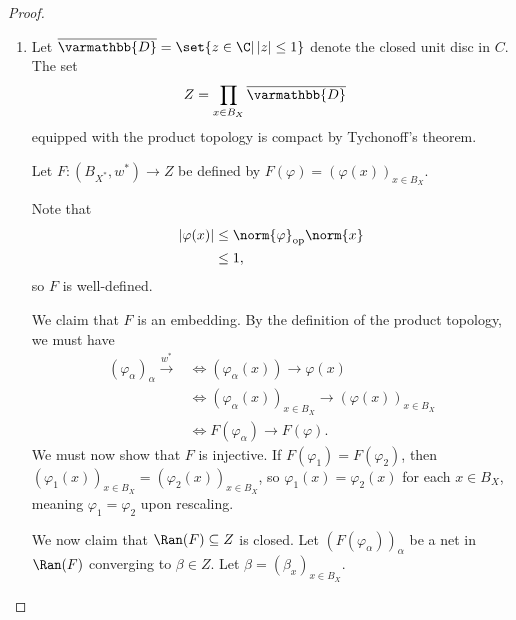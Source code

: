 \documentclass[10pt]{mypackage}
\renewcommand*{\mathbb}[1]{\varmathbb{#1}}
\begin{document}
\begin{proof}\hfill
  \begin{enumerate}[(1)]
    \item Let $\overline{\mathbb{D}} = \set{z\in \C | \left\vert z \right\vert \leq 1}$ denote the closed unit disc in $C$. The set
      \begin{align*}
        Z &= \prod_{x\in B_X} \overline{\mathbb{D}}
      \end{align*}
      equipped with the product topology is compact by Tychonoff's theorem.\newline

      Let $F: \left(B_{X^{\ast}},w^{\ast}\right)\rightarrow Z$ be defined by $F\left(\varphi\right) = \left(\varphi(x)\right)_{x\in B_X}$.\newline

      Note that
      \begin{align*}
        \left\vert \varphi(x) \right\vert &\leq \norm{\varphi}_{\text{op}}\norm{x}\\
                                          &\leq 1,
      \end{align*}
      so $F$ is well-defined.\newline

      We claim that $F$ is an embedding. By the definition of the product topology, we must have
      \begin{align*}
        \left(\varphi_{\alpha}\right)_{\alpha}\xrightarrow{w^{\ast}} &\Leftrightarrow \left(\varphi_{\alpha}\left(x\right)\right)\rightarrow \varphi\left(x\right)\\
                                                                     &\Leftrightarrow \left(\varphi_{\alpha}\left(x\right)\right)_{x\in B_X}\rightarrow \left(\varphi(x)\right)_{x\in B_X}\\
                                                                     &\Leftrightarrow F\left(\varphi_{\alpha}\right)\rightarrow F\left(\varphi\right).
      \end{align*}
      We must now show that $F$ is injective. If $F\left(\varphi_1\right) = F\left(\varphi_2\right)$, then $\left(\varphi_1\left(x\right)\right)_{x\in B_X} = \left(\varphi_2\left(x\right)\right)_{x\in B_X}$, so $\varphi_1\left(x\right) = \varphi_2\left(x\right)$ for each $x\in B_X$, meaning $\varphi_1 = \varphi_2$ upon rescaling.\newline

      We now claim that $\Ran(F) \subseteq Z$ is closed. Let $\left(F\left(\varphi_{\alpha}\right)\right)_{\alpha}$ be a net in $\Ran(F)$ converging to $\beta\in Z$. Let $\beta = \left(\beta_x\right)_{x\in B_X}$.\newline


\end{enumerate}
\end{proof}
\end{document}
